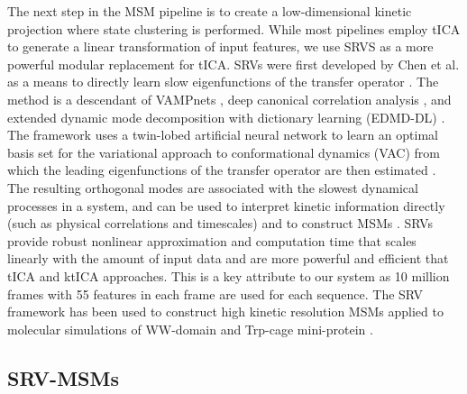 \documentclass[journal=jpcbfk,manuscript=article]{achemso}
\begin{document}
The next step in the MSM pipeline is to create a low-dimensional kinetic projection where state clustering is performed. While most pipelines employ tICA to generate a linear transformation of input features, we use SRVS as a more powerful modular replacement for tICA. SRVs were first developed by Chen et al. as a means to directly learn slow eigenfunctions of the transfer operator \citep{Chen}. The method is a descendant of VAMPnets \citep{Mardt2018VAMPnetsKinetics}, deep canonical correlation analysis \citep{Andrew2013DeepAnalysis}, and extended dynamic mode decomposition with dictionary learning (EDMD-DL) \citep{Li2017ExtendedOperator}. The framework uses a twin-lobed artificial neural network to learn an optimal basis set for the variational approach to conformational dynamics (VAC) from which the leading eigenfunctions of the transfer operator are then estimated \citep{Noe2013ASystems}. The resulting orthogonal modes are associated with the slowest dynamical processes in a system, and can be used to interpret kinetic information directly (such as physical correlations and timescales) and to construct MSMs \citep{Sidky, Pande2010EverythingAsk}. SRVs provide robust nonlinear approximation and computation time that scales linearly with the amount of input data and are more powerful and efficient that tICA and ktICA approaches. This is a key attribute to our system as 10 million frames with 55 features in each frame are used for each sequence. The SRV framework has been used to construct high kinetic resolution MSMs applied to molecular simulations of WW-domain and Trp-cage mini-protein \citep{Chen, Sidky}. 

\subsection{\label{sec:methods}SRV-MSMs}
\end{document}
